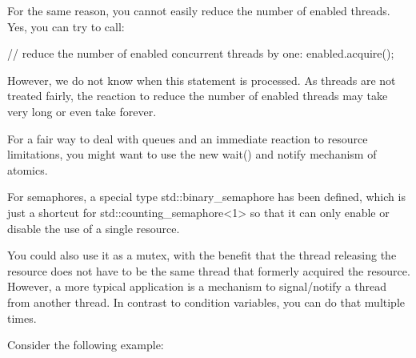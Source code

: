 For the same reason, you cannot easily reduce the number of enabled threads. Yes, you can try to call:

\begin{cpp}
// reduce the number of enabled concurrent threads by one:
enabled.acquire();
\end{cpp}

However, we do not know when this statement is processed. As threads are not treated fairly, the reaction to reduce the number of enabled threads may take very long or even take forever.

For a fair way to deal with queues and an immediate reaction to resource limitations, you might want to use the new wait() and notify mechanism of atomics.


For semaphores, a special type std::binary\_semaphore has been defined, which is just a shortcut for std::counting\_semaphore<1> so that it can only enable or disable the use of a single resource.

You could also use it as a mutex, with the benefit that the thread releasing the resource does not have to be the same thread that formerly acquired the resource. However, a more typical application is a mechanism to signal/notify a thread from another thread. In contrast to condition variables, you can do that multiple times.

Consider the following example:


